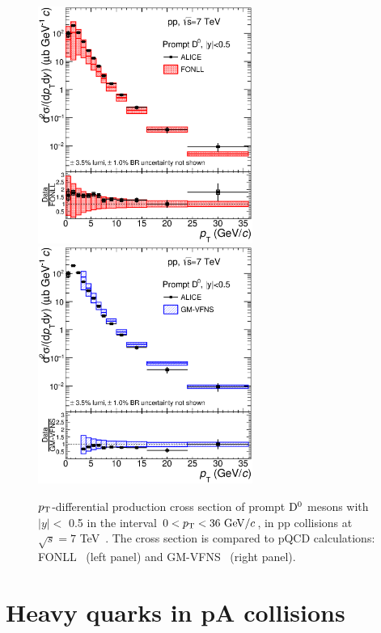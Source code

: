 \begin{figure}[!ht]
  \centering
  \includegraphics[width=7cm]{FigCap2/DzeroppCrossSecVsFONLLAndRatio.eps}
  \includegraphics[width=7cm]{FigCap2/DzeroppCrossSecVsGMVFNSAndRatio.eps}
  \caption{$p_{\rm T}$-differential production cross section of prompt ${\rm D^0}$ mesons with $|y| < $ 0.5 in the interval $0 < p_{\rm T} < 36 ~\mathrm{GeV}/c$, in pp collisions at $\sqrt{s} = 7$ TeV~\cite{Acharya:2017jgo}. The cross section is compared to pQCD calculations: FONLL~\cite{Cacciari:1998it,Cacciari:2001td} (left panel) and GM-VFNS~\cite{Kniehl:2004fy} (right panel).}
  \label{fig:CharmXsec}
\end{figure}

\section{Heavy quarks in pA collisions}
